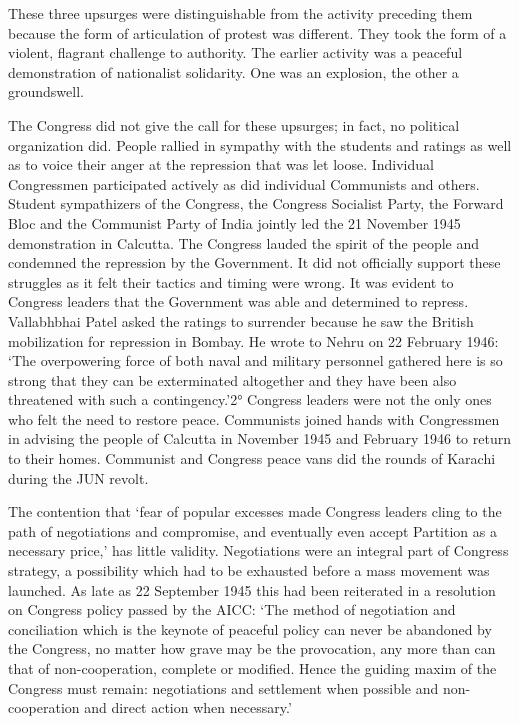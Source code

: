 These three upsurges were distinguishable from the activity preceding them because the form of articulation of protest was different. They took the form of a violent, flagrant challenge to authority. The earlier activity was a peaceful demonstration of nationalist solidarity. One was an explosion, the other a groundswell. 

The Congress did not give the call for these upsurges; in fact, no political organization did. People rallied in sympathy with the students and ratings as well as to voice their anger at the repression that was let loose. Individual Congressmen participated actively as did individual Communists and others. Student sympathizers of the Congress, the Congress Socialist Party, the Forward Bloc and the Communist Party of India jointly led the 21 November 1945 demonstration in Calcutta. The Congress lauded the spirit of the people and condemned the repression by the Government. It did not officially support these struggles as it felt their tactics and timing were wrong. It was evident to Congress leaders that the Government was able and determined to repress. Vallabhbhai Patel asked the ratings to surrender because he saw the British mobilization for repression in Bombay. He wrote to Nehru on 22 February 1946: `The overpowering force of both naval and military personnel gathered here is so strong that they can be exterminated altogether and they have been also threatened with such a contingency.'2° Congress leaders were not the only ones who felt the need to restore peace. Communists joined hands with Congressmen in advising the people of Calcutta in November 1945 and February 1946 to return to their homes. Communist and Congress peace vans did the rounds of Karachi during the JUN revolt. 

The contention that `fear of popular excesses made Congress leaders cling to the path of negotiations and compromise, and eventually even accept Partition as a necessary price,' has little validity. Negotiations were an integral part of Congress strategy, a possibility which had to be exhausted before a mass movement was launched. As late as 22 September 1945 this had been reiterated in a resolution on Congress policy passed by the AICC: `The method of negotiation and conciliation which is the keynote of peaceful policy can never be abandoned by the Congress, no matter how grave may be the provocation, any more than can that of non-cooperation, complete or modified. Hence the guiding maxim of the Congress must remain: negotiations and settlement when possible and non-cooperation and direct action when necessary.' 


